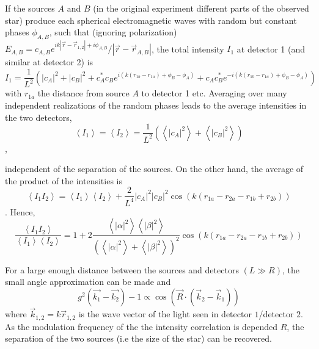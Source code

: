 If the sources $A$ and $B$ (in the original experiment different parts of the observed star) produce each spherical electromagnetic waves with random but constant phases $\phi_{A,B}$, such that (ignoring polarization) $E_{A,B}=c_{A,B} e^{i k\left|\vec{r}-\vec{r}_{1,2}\right|+i \phi_{A,B}} /\left|\vec{r}-\vec{r}_{A,B}\right|$, the total intensity $I_{1}$ at detector 1 (and similar at detector 2) is
\begin{equation}
	I_{1} =
	\frac{1}{L^{2}}\left(
	|c_A|^{2}
	+|c_B|^{2}
	+c_A^{*} c_B     e^{ i\left(k\left(r_{1 b}-r_{1 a}\right)+\phi_{B}-\phi_{A}\right)}
	+c_A     c_B^{*} e^{-i\left(k\left(r_{1 b}-r_{1 a}\right)+\phi_{B}-\phi_{A}\right)}
	\right)
\end{equation}
with $r_{1 a}$ the distance from source $A$ to detector 1 etc. 
Averaging over many independent realizations of the random phases leads to the average intensities in the two detectors,
\begin{equation}
	\left\langle I_{1}\right\rangle=\left\langle I_{2}\right\rangle=\frac{1}{L^{2}}\left(\left\langle|c_A|^{2}\right\rangle+\left\langle|c_B|^{2}\right\rangle\right)
\end{equation}, 

independent of the separation of the sources. On the other hand, the average of the product of the intensities is
\begin{equation}
	\left\langle I_{1} I_{2}\right\rangle =
	\left\langle I_{1}\right\rangle\left\langle I_{2}\right\rangle+\frac{2}{L^{4}}|c_A|^{2}|c_B|^{2} \cos \left(k\left(r_{1 a}-r_{2 a}-r_{1 b}+r_{2 b}\right)\right) 
\end{equation}.
Hence,
\begin{equation}
	\frac{\left\langle I_{1} I_{2}\right\rangle}{\left\langle I_{1}\right\rangle\left\langle I_{2}\right\rangle}
	=1+2 \frac{\left\langle|\alpha|^{2}\right\rangle\left\langle|\beta|^{2}\right\rangle}{\left(\left\langle|\alpha|^{2}\right\rangle+\left\langle|\beta|^{2}\right\rangle\right)^{2}} \cos \left(k\left(r_{1 a}-r_{2 a}-r_{1 b}+r_{2 b}\right)\right)
\end{equation}

For a large enough distance between the sources and detectors $(L \gg R)$, the small angle approximation can be made and
\begin{equation}
	g^2\left(\vec{k_1}-\vec{k_2}\right)-1\propto \cos{\left(\vec{R} \cdot\left(\vec{k}_{2}-\vec{k}_{1}\right)\right)}
\end{equation} 
where $\vec{k}_{1,2}=k \vec{r}_{1,2}$ is the wave vector of the light seen in detector $1$/detector $2$. As the modulation frequency of the the intensity correlation is depended $R$, the separation of the two sources (i.e the size of the star) can be recovered.
\clearpage

